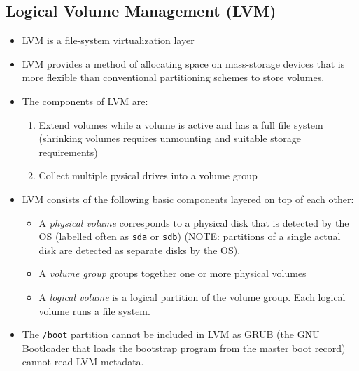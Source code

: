 \documentclass{article}
\begin{document}
\subsection{Logical Volume Management (LVM)}
\label{lvm}
\begin{itemize}
    \item LVM is a file-system virtualization layer 
    
    \item LVM provides a method of allocating space on mass-storage devices that is more flexible than conventional partitioning schemes to store volumes.
    
    \item The components of LVM are:
    \begin{enumerate}
        \item Extend volumes while a volume is active and has a full file system (shrinking volumes requires unmounting and suitable storage requirements)
        
        \item Collect multiple pysical drives into a volume group 
    \end{enumerate}
    
    \item LVM consists of the following basic components layered on top of each other:
    \begin{itemize}
        \item A \textit{physical volume} corresponds to a physical disk that is detected by the OS (labelled often as \texttt{sda} or \texttt{sdb}) (NOTE: partitions of a single actual disk are detected as separate disks by the OS). 
        
        \item A \textit{volume group} groups together one or more physical volumes
        
        \item A \textit{logical volume} is a logical partition of the volume group. Each logical volume runs a file system. 
    \end{itemize}
    
    \item The \texttt{/boot} partition cannot be included in LVM as GRUB (the GNU Bootloader that loads the bootstrap program from the master boot record) cannot read LVM metadata. 
    
\end{itemize}
\end{document}
